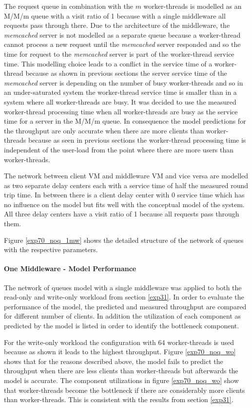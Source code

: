 \documentclass[report.tex]{subfiles}
\begin{document}
The request queue in combination with the $m$ worker-threads is modelled as an M/M/m queue with a visit ratio of 1 because with a single middleware all requests pass through there. Due to the architecture of the middleware, the \emph{memcached} server is not modelled as a separate queue because a worker-thread cannot process a new request until the \emph{memcached} server responded and so the time for request to the \emph{memcached} server is part of the worker-thread service time. This modelling choice leads to a conflict in the service time of a worker-thread because as shown in previous sections the server service time of the \emph{memcached} server is depending on the number of busy worker-threads and so in an under-saturated system the worker-thread service time is smaller than in a system where all worker-threads are busy. 
It was decided to use the measured worker-thread processing time when all worker-threads are busy as the service time for a server in the M/M/m queue. In consequence the model predictions for the throughput are only accurate when there are more clients than worker-threads because as seen in previous sections the worker-thread processing time is independent of the user-load from the point where there are more users than worker-threads.

The network between client VM and middleware VM and vice versa are modelled as two separate delay centers each with a service time of half the measured round trip time. In between there is a client delay center with 0 service time which has no influence on the model but fits well with the conceptual model of the system. All three delay centers have a visit ratio of 1 because all requests pass through them.

Figure \ref{exp70_noq_1mw} shows the detailed structure of the network of queues with the respective parameters.

\paragraph{One Middleware - Model Performance}
The network of queues model with a single middleware was applied to both the read-only and write-only workload from section \ref{exp31}.
In order to evaluate the performance of the model, the predicted and measured throughput are compared for different number of clients.
In addition the utilization of each component as predicted by the model is listed in order to identify the bottleneck component.


For the write-only workload the configuration with 64 worker-threads is used because as shown it leads to the highest throughput.
Figure \ref{exp70_noq_wo} shows that for the reasons described above, the model fails to predict the throughput when there are less clients than worker-threads but afterwards the model is accurate. The component utilizations in figure \ref{exp70_noq_wo} show that worker-threads become the bottleneck if there are considerably more clients than worker-threads. This is consistent with the results from section \ref{exp31}.
\end{document}
